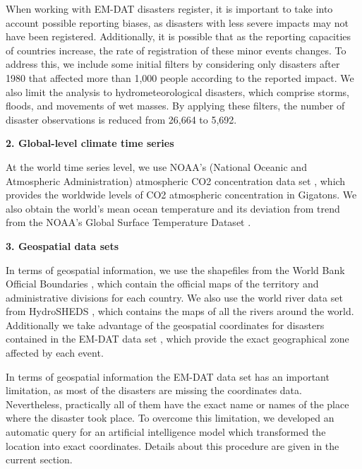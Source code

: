 When working with EM-DAT disasters register, it is important to take into account possible reporting biases, as disasters with less severe impacts may not have been registered. Additionally, it is possible that as the reporting capacities of countries increase, the rate of registration of these minor events changes. To address this, we include some initial filters by considering only disasters after 1980 that affected more than 1,000 people according to the reported impact. We also limit the analysis to hydrometeorological disasters, which comprise storms, floods, and movements of wet masses. By applying these filters, the number of disaster observations is reduced from 26,664 to 5,692.

\textbf{2. Global-level climate time series}

At the world time series level, we use NOAA's (National Oceanic and Atmospheric Administration) atmospheric CO2 concentration data set \citep{noaa_co2_2024}, which provides the worldwide levels of CO2 atmospheric concentration in Gigatons. We also obtain the world's mean ocean temperature and its deviation from trend from the NOAA's Global Surface Temperature Dataset \citep{zhang_noaa_2019}.

\textbf{3. Geospatial data sets}

In terms of geospatial information, we use the shapefiles from the World Bank Official Boundaries \citep{worldbank_boundaries_2024}, which contain the official maps of the territory and administrative divisions for each country. We also use the world river data set from HydroSHEDS \citep{lehner_global_2013}, which contains the maps of all the rivers around the world.  Additionally we take advantage of the geospatial coordinates for disasters contained in the EM-DAT data set \citep{cred_emdat_2024}, which provide the exact geographical zone affected by each event.

In terms of geospatial information the EM-DAT data set has an important limitation, as most of the disasters are missing the coordinates data. Nevertheless, practically all of them have the exact name or names of the place where the disaster took place. To overcome this limitation, we developed an automatic query for an artificial intelligence model which transformed the location into exact coordinates. Details about this procedure are given in the current section.

